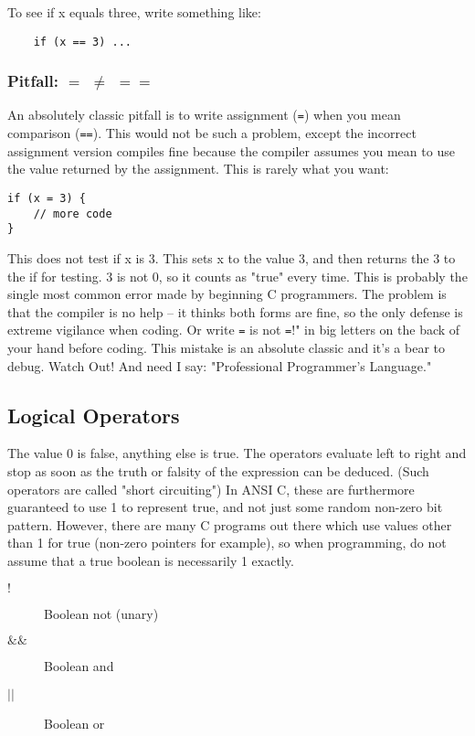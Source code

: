 To see if x equals three, write something like:

\begin{lstlisting}
    if (x == 3) ...
\end{lstlisting}


\subsubsection{Pitfall: $=$ $\ne$ $==$}

An absolutely classic pitfall is to write assignment (\lstinline{=}) when you mean comparison (\lstinline{==}). This would not be such a problem, except the incorrect assignment version compiles fine because the compiler assumes you mean to use the value returned by the assignment. This is rarely what you want:

\begin{lstlisting}
if (x = 3) {
    // more code 
}
\end{lstlisting}

This does not test if x is 3. This sets x to the value 3, and then returns the 3 to the if for testing. 3 is not 0, so it counts as "true" every time. This is probably the single most common error made by beginning C programmers. The problem is that the compiler is no help -- it thinks both forms are fine, so the only defense is extreme vigilance when coding. Or write \lstinline{=} is not \lstinline{=}!" in big letters on the back of your hand before coding. This mistake is an absolute classic and it's a bear to debug. Watch Out! And need I say: "Professional Programmer's Language."

\subsection{Logical Operators}

The value 0 is false, anything else is true. The operators evaluate left to right and stop as soon as the truth or falsity of the expression can be deduced. (Such operators are called "short circuiting") In ANSI C, these are furthermore guaranteed to use 1 to represent true, and not just some random non-zero bit pattern. However, there are many C programs out there which use values other than 1 for true (non-zero pointers for example), so when programming, do not assume that a true boolean is necessarily 1 exactly.

\begin{description}
\item[$!$] Boolean not (unary)
\item[$\&\&$] Boolean and
\item[$||$] Boolean or
\end{description}


